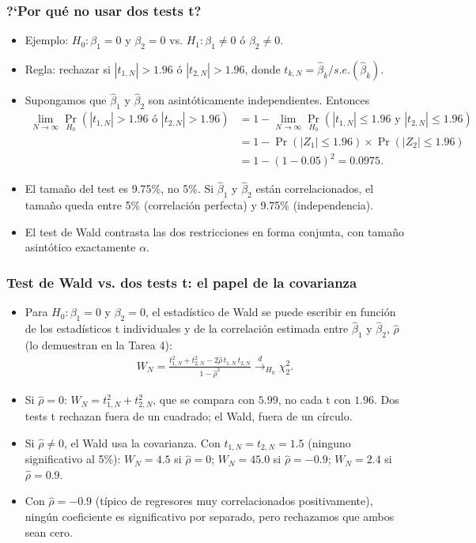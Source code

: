 \documentclass[t, compress, spanish, aspectratio=169]{beamer}
\newcommand{\dto}{\stackrel{d}{\longrightarrow}}
\begin{document}
\begin{frame}
\frametitle{?`Por qu\'e no usar dos tests t?}
        \begin{itemize}
            \item  Ejemplo: $H_0: \beta_1 = 0$ y $\beta_2 = 0$ vs. $H_1: \beta_1 \neq 0$ \'o $\beta_2 \neq 0$.
            \item  Regla: rechazar si $|t_{1,N}|>1.96$ \'o  $|t_{2,N}|>1.96$, donde $t_{k,N}=\hat \beta_k/s.e.(\hat \beta_k)$.
            \item  Supongamos que $\hat \beta_1$ y $\hat \beta_2$ son asint\'oticamente independientes. Entonces
             \begin{align*}
                \lim_{N\to\infty}\Pr_{H_0}(|t_{1,N}|>1.96 \text{ \'o } |t_{2,N}|>1.96)
                &=1-\lim_{N\to\infty}\Pr_{H_0}(|t_{1,N}|\leq 1.96 \text{ y } |t_{2,N}|\leq 1.96)\\
                &=1-\Pr(|Z_1|\leq 1.96) \times  \Pr(|Z_2|\leq 1.96)\\
                &= 1-(1-0.05)^2=0.0975.
            \end{align*}
            \item El tama\~no del test es \alert{9.75\%}, no 5\%. Si $\hat \beta_1$ y $\hat \beta_2$ est\'an correlacionados, el tama\~no queda entre 5\% (correlaci\'on perfecta) y 9.75\% (independencia).
            \item El test de Wald contrasta las dos restricciones en forma conjunta, con tama\~no asint\'otico exactamente $\alpha$.
        \end{itemize}
\end{frame}
\begin{frame}
\frametitle{Test de Wald vs. dos tests t: el papel de la covarianza}
\small
        \begin{itemize}
            \item Para $H_0: \beta_1 = 0$ y $\beta_2 = 0$, el estad\'istico de Wald se puede escribir en funci\'on de los estad\'isticos t individuales y de la correlaci\'on estimada entre $\hat\beta_1$ y $\hat\beta_2$, $\hat\rho$ (lo demuestran en la Tarea 4):
            \begin{align*}
                W_N = \frac{t_{1,N}^2 + t_{2,N}^2-2 \hat \rho\, t_{1,N}\,t_{2,N}}{1-\hat\rho^2} \dto_{H_0} \chi^2_2.
            \end{align*}
            \item Si $\hat\rho=0$: $W_N=t_{1,N}^2+t_{2,N}^2$, que se compara con $5.99$, no cada t con $1.96$. Dos tests t rechazan fuera de un cuadrado; el Wald, fuera de un c\'irculo.
            \item Si $\hat\rho\neq0$, el Wald usa la covarianza. Con $t_{1,N}=t_{2,N}=1.5$ (ninguno significativo al 5\%): $W_N=4.5$ si $\hat\rho=0$; $W_N=45.0$ si $\hat\rho=-0.9$; $W_N=2.4$ si $\hat\rho=0.9$.
            \item Con $\hat\rho=-0.9$ (t\'ipico de regresores muy correlacionados positivamente), ning\'un coeficiente es significativo por separado, pero rechazamos que ambos sean cero.
        \end{itemize}
\end{frame}
\end{document}
